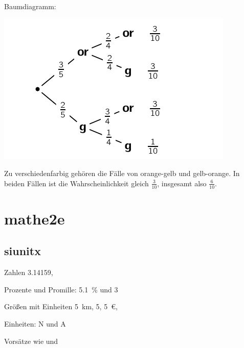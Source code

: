\documentclass[a4paper,12pt]{article}
\begin{document}
\begin{solution}
\begin{subparts}
	\subpart Baumdiagramm:

	\includegraphics{baumdiagramm}

	\subpart Zu verschiedenfarbig gehören die Fälle von orange-gelb und gelb-orange. In beiden Fällen ist die Wahrscheinlichkeit gleich $\frac{3}{10}$, insgesamt also $\frac{6}{10}$.
\end{subparts}

\end{solution}












\clearpage

\section{mathe2e}







 \subsection{siunitx}

Zahlen
\num{3.14159},

Prozente und Promille:
\qty{5.1}{\percent} und 
\qty{3}{\permille}

Größen mit Einheiten
\qty{5}{\km},
\qty{5}{\kmh},
\qty{5}{\euro},

Einheiten:
\unit{\newton} und \unit{\ampere}

Vorsätze wie \prefix{\kilo} und \prefix{\giga}
\end{document}
